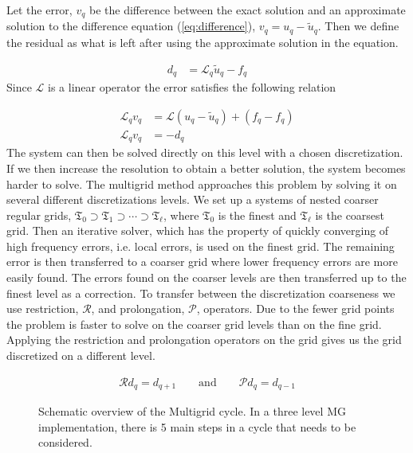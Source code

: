 	Let the error, \(v_q\) be the difference between the exact solution and an approximate
	solution to the difference equation (\ref{eq:difference}), \( v_q = u_q - \tilde{u}_q \).
	Then we define the residual as what is left after using the approximate solution
	in the equation.

	\begin{align}
		d_q &= \mathcal{L}_q \tilde{u}_q - f_q
	\end{align}
	Since \(\mathcal{L}\) is a linear operator the error satisfies the following relation

	\begin{align}
		\mathcal{L}_q v_q &= \mathcal{L}(u_q - \tilde{u}_q)  + (f_q- f_q)
		\\
		\mathcal{L}_q v_q &= - d_q \label{eq:diff_MG}
	\end{align}
	The system can then be solved directly on this level with a chosen discretization.
	If we then increase the resolution to obtain a better solution, the system
	becomes harder to solve. The multigrid method approaches this problem
	by solving it on several different discretizations levels.
	We set up a systems of nested coarser regular grids,
	\(\mathfrak{T}_0 \supset \mathfrak{T}_{1} \supset \cdots \supset \mathfrak{T}_\ell\),
	where \(\mathfrak{T}_0\) is the finest and \(\mathfrak{T}_\ell\) is the coarsest grid.
	Then an iterative solver, which has the property of quickly converging of high frequency errors, i.e.
	local errors, is used on the finest grid. The remaining error is then transferred
	to a coarser grid where lower frequency errors are more easily found. The errors
	found on the coarser levels are then transferred up to the finest level as a correction.
	To transfer between the discretization coarseness we use restriction, \( \mathcal{R} \),
	and prolongation, \( \mathcal{P} \), operators. Due to the fewer grid points the problem is
	faster to solve on the coarser grid levels than on the fine grid.
	Applying the restriction and prolongation operators on the grid gives us
	the grid discretized on a different level.

	\begin{align}
		\mathcal{R} d_q = d_{q+1} \qquad \text{and} \qquad \mathcal{P} d_q = d_{q - 1}
	\end{align}

	\begin{figure}
	    \center
		
		\caption{Schematic overview of the Multigrid cycle. In a three level MG implementation,
		there is 5 main steps in a cycle that needs to be considered.}
		\label{fig:MG_schematic}
	\end{figure}


